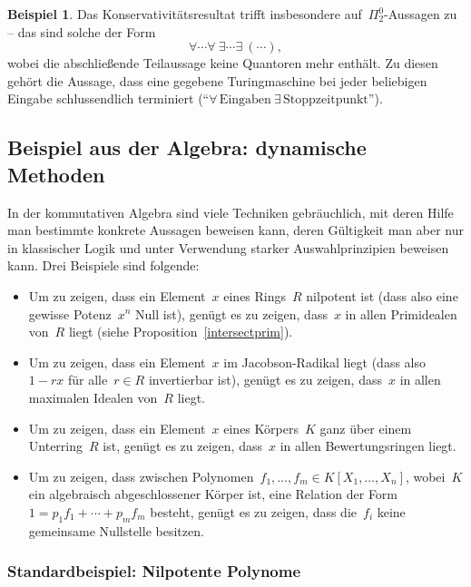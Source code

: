 \documentclass[a4paper,ngerman,12pt]{scrartcl}
\theoremstyle{definition}
\newtheorem{bsp}[defn]{Beispiel}
\theoremstyle{plain}
\theoremstyle{remark}
\renewcommand{\_}{\mathpunct{.}\,}
\newcommand{\?}{\,{:}\,}
\begin{document}
\begin{bsp}Das Konservativitätsresultat trifft insbesondere
auf~$\Pi^0_2$-Aussagen zu -- das sind solche der Form
\[ \forall \cdots \forall\ \exists \cdots \exists\ (\cdots), \]
wobei die abschließende Teilaussage keine Quantoren mehr enthält. Zu diesen
gehört die Aussage, dass eine gegebene Turingmaschine bei jeder
beliebigen Eingabe schlussendlich terminiert ("`$\forall\,\text{Eingaben}\
\exists\,\text{Stoppzeitpunkt}$"').
\end{bsp}




\subsection{Beispiel aus der Algebra: dynamische Methoden}

In der kommutativen Algebra sind viele Techniken gebräuchlich, mit deren Hilfe
man bestimmte konkrete Aussagen beweisen kann, deren Gültigkeit man aber nur
in klassischer Logik und unter Verwendung starker Auswahlprinzipien beweisen
kann. Drei Beispiele sind folgende:

\begin{itemize}
\item Um zu zeigen, dass ein Element~$x$ eines Rings~$R$ nilpotent ist (dass
also eine gewisse Potenz~$x^n$ Null ist), genügt es zu zeigen, dass~$x$ in
allen Primidealen von~$R$ liegt (siehe Proposition~\ref{intersectprim}).
\item Um zu zeigen, dass ein Element~$x$ im Jacobson-Radikal liegt (dass
also~$1-rx$ für alle~$r \in R$ invertierbar ist), genügt es zu zeigen, dass~$x$
in allen maximalen Idealen von~$R$ liegt.
\item Um zu zeigen, dass ein Element~$x$ eines Körpers~$K$ ganz über einem
Unterring~$R$ ist, genügt es zu zeigen, dass~$x$ in allen Bewertungsringen
liegt.
\item Um zu zeigen, dass zwischen Polynomen~$f_1,\ldots,f_m \in
K[X_1,\ldots,X_n]$, wobei~$K$ ein algebraisch abgeschlossener Körper ist, eine
Relation der Form~$1 = p_1 f_1 + \cdots + p_m f_m$ besteht, genügt es zu
zeigen, dass die~$f_i$ keine gemeinsame Nullstelle besitzen.
\end{itemize}


\subsubsection*{Standardbeispiel: Nilpotente Polynome}
\label{bsp:nilpotentepolynome}
\end{document}
